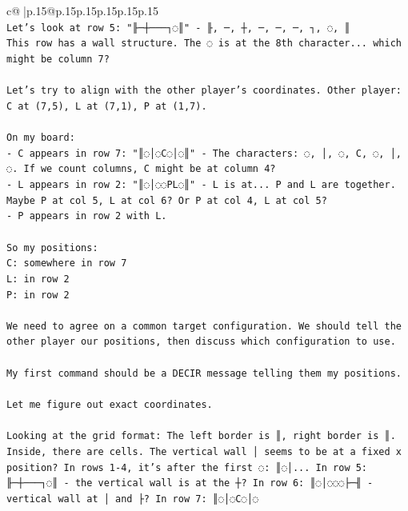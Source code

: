\documentclass{article}
\begin{document}
{\begin{supertabular}{c@{$\;$}|p{.15\linewidth}@{}p{.15\linewidth}p{.15\linewidth}p{.15\linewidth}p{.15\linewidth}p{.15\linewidth}}
{{{\\ 
\texttt{Let's look at row 5: "╟─┼───┐◌║" {-} ╟, ─, ┼, ─, ─, ─, ┐, ◌, ║} \\
\texttt{This row has a wall structure. The ◌ is at the 8th character... which might be column 7?} \\
\\ 
\texttt{Let's try to align with the other player's coordinates. Other player: C at (7,5), L at (7,1), P at (1,7).} \\
\\ 
\texttt{On my board:} \\
\texttt{{-} C appears in row 7: "║◌│◌C◌│◌║" {-} The characters: ◌, │, ◌, C, ◌, │, ◌. If we count columns, C might be at column 4?} \\
\texttt{{-} L appears in row 2: "║◌│◌◌PL◌║" {-} L is at... P and L are together. Maybe P at col 5, L at col 6? Or P at col 4, L at col 5?} \\
\texttt{{-} P appears in row 2 with L.} \\
\\ 
\texttt{So my positions:} \\
\texttt{C: somewhere in row 7} \\
\texttt{L: in row 2} \\
\texttt{P: in row 2} \\
\\ 
\texttt{We need to agree on a common target configuration. We should tell the other player our positions, then discuss which configuration to use.} \\
\\ 
\texttt{My first command should be a DECIR message telling them my positions.} \\
\\ 
\texttt{Let me figure out exact coordinates.} \\
\\ 
\texttt{Looking at the grid format: The left border is ║, right border is ║. Inside, there are cells. The vertical wall │ seems to be at a fixed x position? In rows 1{-}4, it's after the first ◌: ║◌│... In row 5: ╟─┼───┐◌║ {-} the vertical wall is at the ┼? In row 6: ║◌│◌◌◌├─╢ {-} vertical wall at │ and ├? In row 7: ║◌│◌C◌│◌} \\
            }
        }
    }
     \\ \\


\end{supertabular}}
\end{document}

